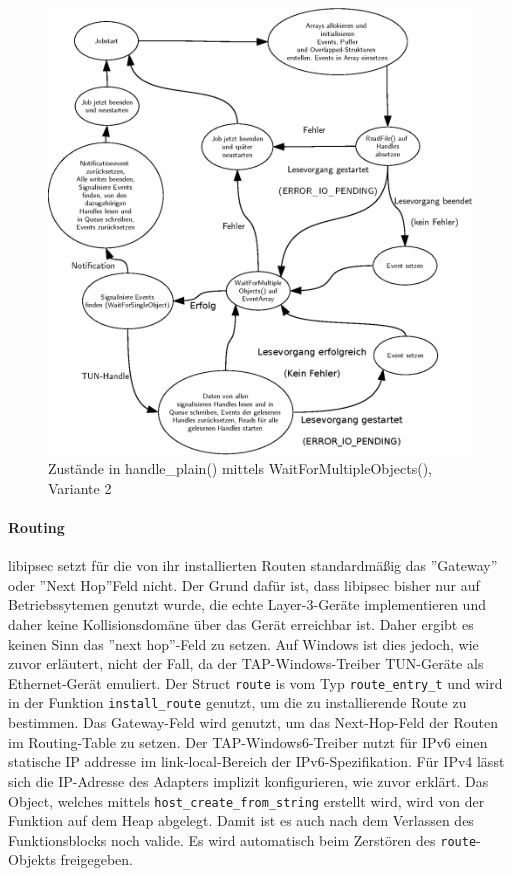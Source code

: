 {\begin{figure}
\centering
\def\svgwidth{\columnwidth}
\includegraphics[width=\textwidth]{WaitForMultipleObjects2.eps}
\caption{Zustände in handle\_plain() mittels WaitForMultipleObjects(), Variante 2}
\label{fig:WaitForMultipleObjects2}
\end{figure}

\paragraph{Routing}
libipsec setzt für die von ihr installierten Routen standardmäßig das ''Gateway''
oder ''Next Hop''Feld nicht. Der Grund dafür ist, dass libipsec bisher nur auf
Betriebssytemen genutzt wurde, die echte Layer-3-Geräte implementieren und
daher keine Kollisionsdomäne über das Gerät erreichbar ist. Daher ergibt es keinen
Sinn das ''next hop''-Feld zu setzen.
Auf Windows ist dies jedoch, wie zuvor erläutert, nicht der Fall, da der TAP-Windows-Treiber
TUN-Geräte als Ethernet-Gerät emuliert.
Der Struct \texttt{route} is vom Typ \texttt{route\_entry\_t} und wird in der Funktion
\texttt{install\_route} genutzt, um die zu installierende Route zu bestimmen.
Das Gateway-Feld wird genutzt, um das Next-Hop-Feld der Routen im Routing-Table
zu setzen. 
Der TAP-Windows6-Treiber nutzt für IPv6 einen statische IP addresse im link-local-Bereich
der IPv6-Spezifikation.
Für IPv4 lässt sich die IP-Adresse des Adapters implizit konfigurieren, wie zuvor erklärt.
Das Object, welches mittels \texttt{host\_create\_from\_string} erstellt wird,
wird von der Funktion auf dem Heap abgelegt. Damit ist es auch nach dem Verlassen
des Funktionsblocks noch valide. Es wird automatisch beim Zerstören des
\texttt{route}-Objekts freigegeben.

}
